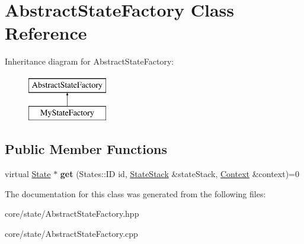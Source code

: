 \hypertarget{classAbstractStateFactory}{\section{\-Abstract\-State\-Factory \-Class \-Reference}
\label{classAbstractStateFactory}
}
\-Inheritance diagram for \-Abstract\-State\-Factory\-:\begin{figure}[H]
\begin{center}
\leavevmode
\includegraphics[height=2.000000cm]{classAbstractStateFactory}
\end{center}
\end{figure}
\subsection*{\-Public \-Member \-Functions}
\begin{DoxyCompactItemize}
\item 
\hypertarget{classAbstractStateFactory_aa009b802527e422ca064d8f4cae95a90_aa009b802527e422ca064d8f4cae95a90}{virtual \hyperlink{classState}{\-State} $\ast$ {\bfseries get} (\-States\-::\-I\-D id, \hyperlink{classStateStack}{\-State\-Stack} \&state\-Stack, \hyperlink{classContext}{\-Context} \&context)=0}\label{classAbstractStateFactory_aa009b802527e422ca064d8f4cae95a90_aa009b802527e422ca064d8f4cae95a90}

\end{DoxyCompactItemize}


\-The documentation for this class was generated from the following files\-:\begin{DoxyCompactItemize}
\item 
core/state/\-Abstract\-State\-Factory.\-hpp\item 
core/state/\-Abstract\-State\-Factory.\-cpp\end{DoxyCompactItemize}
